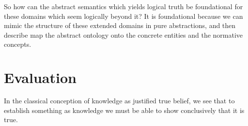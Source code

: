 So how can the abstract semantics which yields logical truth be foundational for these domains which seem logically beyond it?
It is foundational because we can mimic the structure of these extended domains in pure abstractions, and then describe map the abstract ontology onto the concrete entities and the normative concepts.

\section{Evaluation}

In the classical conception of knowledge as justified true belief, we see that to establish something as knowledge we must be able to show conclusively that it is true.


